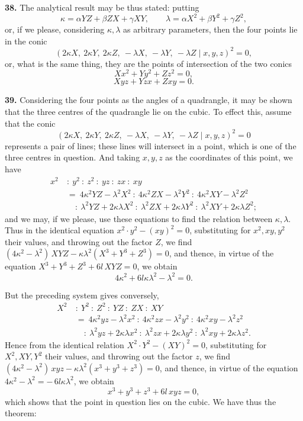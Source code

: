 \documentclass[11pt]{article}
\begin{document}
\medskip

\noindent \textbf{38.} The analytical result may be thus stated: putting
\[
\kappa = \alpha Y Z + \beta Z X + \gamma X Y,\qquad \lambda = \alpha X^2 + \beta Y^2 + \gamma Z^2,
\]
or, if we please, considering $\kappa, \lambda$ as arbitrary parameters, then the four points lie in the conic
\[
(2 \kappa X,\ 2 \kappa Y,\ 2 \kappa Z,\ -\lambda X,\ -\lambda Y,\ -\lambda Z\mid x, y, z)^2 = 0,
\]
or, what is the same thing, they are the points of intersection of the two conics
\[
X x^2 + Y y^2 + Z z^2 = 0,
\]
\[
X y z + Y z x + Z x y = 0.
\]

\medskip

\noindent \textbf{39.} Considering the four points as the angles of a quadrangle, it may be shown that the three centres of the quadrangle lie on the cubic. To effect this, assume that the conic
\[
(2 \kappa X,\ 2 \kappa Y,\ 2 \kappa Z,\ -\lambda X,\ -\lambda Y,\ -\lambda Z\mid x, y, z)^2 = 0
\]
represents a pair of lines; these lines will intersect in a point, which is one of the three centres in question. And taking $x, y, z$ as the coordinates of this point, we have
\begin{align*}
x^2 \ &:\ y^2\ :\ z^2\ :\ yz\ :\ zx\ :\ xy \\
&=\ 4 \kappa^2 Y Z - \lambda^2 X^2\ :\ 4 \kappa^2 Z X - \lambda^2 Y^2\ :\ 4 \kappa^2 X Y - \lambda^2 Z^2 \\
&\quad :\ \lambda^2 Y Z + 2 \kappa \lambda X^2\ :\ \lambda^2 Z X + 2 \kappa \lambda Y^2\ :\ \lambda^2 X Y + 2 \kappa \lambda Z^2;
\end{align*}
and we may, if we please, use these equations to find the relation between $\kappa, \lambda$. Thus in the identical equation $x^2 \cdot y^2 - (xy)^2 = 0$, substituting for $x^2, xy, y^2$ their values, and throwing out the factor $Z$, we find $(4\kappa^2 - \lambda^2)\,X Y Z - \kappa\lambda^2 (X^3 + Y^3 + Z^3) = 0$, and thence, in virtue of the equation $X^3 + Y^3 + Z^3 + 6 l\, X Y Z = 0$, we obtain
\[
4\kappa^2 + 6 l \kappa\lambda^2 - \lambda^2 = 0.
\]

But the preceding system gives conversely,
\begin{align*}
X^2 \ &:\ Y^2\ :\ Z^2\ :\ Y Z\ :\ Z X\ :\ X Y \\
&=\ 4\kappa^2 y z - \lambda^2 x^2\ :\ 4\kappa^2 z x - \lambda^2 y^2\ :\ 4\kappa^2 x y - \lambda^2 z^2 \\
&\quad :\ \lambda^2 y z + 2 \kappa \lambda x^2\ :\ \lambda^2 z x + 2 \kappa \lambda y^2\ :\ \lambda^2 x y + 2 \kappa \lambda z^2.
\end{align*}
Hence from the identical relation $X^2 \cdot Y^2 - (X Y)^2 = 0$, substituting for $X^2, X Y, Y^2$ their values, and throwing out the factor $z$, we find $(4\kappa^2 - \lambda^2)\, x y z - \kappa\lambda^2 (x^3 + y^3 + z^3) = 0$, and thence, in virtue of the equation $4\kappa^2 - \lambda^2 = -\,6 l \kappa \lambda^2$, we obtain
\[
x^3 + y^3 + z^3 + 6 l\, x y z = 0,
\]
which shows that the point in question lies on the cubic. We have thus the theorem:
\end{document}

